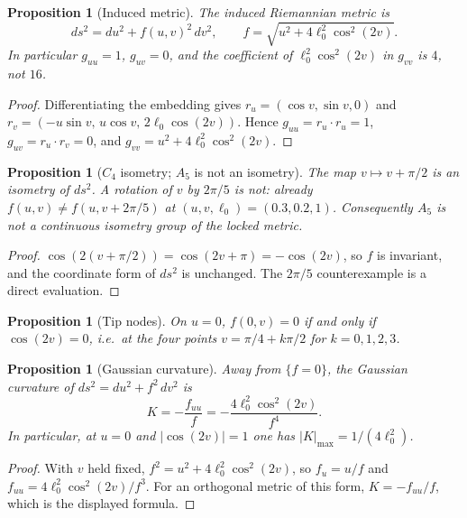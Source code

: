 \documentclass[11pt,a4paper]{article}
\newtheorem{proposition}[theorem]{Proposition}
\theoremstyle{definition}
\theoremstyle{remark}
\begin{document}
\begin{proposition}[Induced metric]
\label{prop:metric}
The induced Riemannian metric is
\begin{equation}
  ds^2=du^2+f(u,v)^2\,dv^2,
  \qquad
  f=\sqrt{u^2+4\ell_0^2\cos^2(2v)}.
\end{equation}
In particular $g_{uu}=1$, $g_{uv}=0$, and the coefficient of
$\ell_0^2\cos^2(2v)$ in $g_{vv}$ is $4$, not $16$.
\end{proposition}

\begin{proof}
Differentiating the embedding gives
$r_u=(\cos v,\sin v,0)$ and
$r_v=(-u\sin v,\,u\cos v,\,2\ell_0\cos(2v))$.
Hence $g_{uu}=r_u\cdot r_u=1$, $g_{uv}=r_u\cdot r_v=0$, and
$g_{vv}=u^2+4\ell_0^2\cos^2(2v)$.
\end{proof}

\begin{proposition}[$C_4$ isometry; $A_5$ is not an isometry]
\label{prop:c4}
The map $v\mapsto v+\pi/2$ is an isometry of $ds^2$. A rotation of $v$
by $2\pi/5$ is not: already $f(u,v)\neq f(u,v+2\pi/5)$ at
$(u,v,\ell_0)=(0.3,0.2,1)$. Consequently $A_5$ is not a continuous
isometry group of the locked metric.
\end{proposition}

\begin{proof}
$\cos(2(v+\pi/2))=\cos(2v+\pi)=-\cos(2v)$, so $f$ is invariant, and the
coordinate form of $ds^2$ is unchanged. The $2\pi/5$ counterexample is
a direct evaluation.
\end{proof}

\begin{proposition}[Tip nodes]
\label{prop:tips}
On $u=0$, $f(0,v)=0$ if and only if $\cos(2v)=0$, i.e.\ at the four
points $v=\pi/4+k\pi/2$ for $k=0,1,2,3$.
\end{proposition}

\begin{proposition}[Gaussian curvature]
\label{prop:curvature}
Away from $\{f=0\}$, the Gaussian curvature of $ds^2=du^2+f^2\,dv^2$ is
\[
  K=-\frac{f_{uu}}{f}=-\frac{4\ell_0^2\cos^2(2v)}{f^4}.
\]
In particular, at $u=0$ and $|\cos(2v)|=1$ one has
$|K|_{\max}=1/(4\ell_0^2)$.
\end{proposition}

\begin{proof}
With $v$ held fixed, $f^2=u^2+4\ell_0^2\cos^2(2v)$, so
$f_u=u/f$ and $f_{uu}=4\ell_0^2\cos^2(2v)/f^3$. For an orthogonal
metric of this form, $K=-f_{uu}/f$, which is the displayed formula.
\end{proof}
\end{document}
